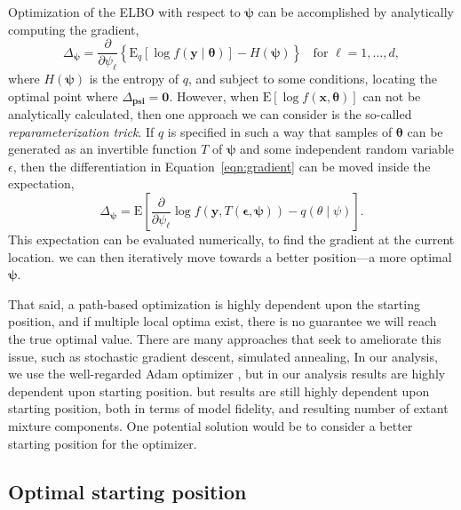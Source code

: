 Optimization of the ELBO with respect to $\bm{\psi}$ can be accomplished by
    analytically computing the gradient,
    \begin{equation}
        \label{eqn:gradient}
        \Delta_{\bm{\psi}} = \frac{\partial}{\partial \psi_{\ell}}
            \left\lbrace\text{E}_{q}\left[\log f(\bm{y}\mid\bm{\theta})\right] 
                - H(\bm{\psi})\right\rbrace
            \;\;\text{ for }\ell = 1,\ldots,d,
    \end{equation}
    where $H(\bm{\psi})$ is the entropy of $q$, and subject to some conditions,
    locating the optimal point where $\Delta_{\bm{psi}} = \bm{0}$.  However, when 
    $\text{E}[\log f(\bm{x},\bm{\theta})]$ can not be analytically calculated, then
    one approach we can consider is the so-called \emph{reparameterization trick}.
    If $q$ is specified in such a way that samples of $\bm{\theta}$ can be generated
    as an invertible function $T$ of $\bm{\psi}$ and some independent random variable 
    $\epsilon$, then the differentiation in Equation~\ref{eqn:gradient} can be 
    moved inside the expectation,
    \begin{equation}
        \label{eqn:reparameterization}
        \Delta_{\bm{\psi}} = \text{E}\left[\frac{\partial}{\partial \psi_\ell}
            \log f\left(\bm{y},T(\bm{\epsilon},\bm{\psi})\right) -
            q(\theta\mid\psi)\right].
    \end{equation}
    This expectation can be evaluated numerically, to find the gradient at the current
    location. we can then iteratively move towards a better position---a more optimal 
    $\bm{\psi}$.

That said, a path-based optimization is highly dependent upon the starting position,
    and if multiple local optima exist, there is no guarantee we will reach the
    true optimal value.  There are many approaches that seek to ameliorate this issue,
    such as stochastic gradient descent, simulated annealing, 
    In our analysis, we use the well-regarded Adam optimizer \citep{kingma2017}, 
    but in our analysis results are highly dependent upon starting position.
    but results are still highly dependent upon starting position, both in terms of 
    model fidelity, and resulting number of extant mixture components.  One potential
    solution would be to consider a better starting position for the optimizer.

\subsection{Optimal starting position}

